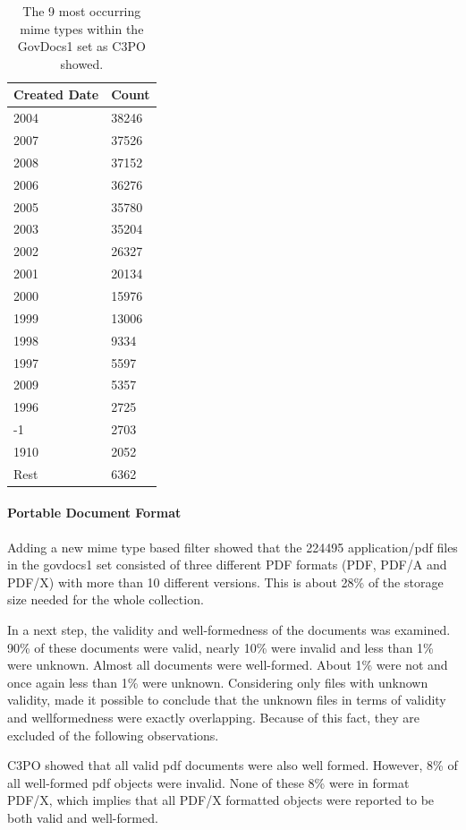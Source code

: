 \begin{table}[h]
\centering
\begin{tabular}{l || l }
\hline
Created Date & Count \\
\hline
\hline
2004 	& 38246 \\
2007 	&  37526 \\
2008		&  37152 \\
2006 	&  36276 \\
2005		&  35780 \\
2003		&  35204 \\
2002		&  26327 \\
2001		&  20134 \\
2000		& 15976 \\
1999		& 13006 \\
1998		&  9334 \\
1997		&  5597 \\
2009		&  5357\\
1996		&  2725\\
-1		&  2703\\
1910		&  2052\\
Rest		&  6362\\
 \hline
\end{tabular}
\caption{The 9 most occurring mime types within the GovDocs1 set as C3PO showed.}
\label{tab:govdocs1_created}
\end{table}

\paragraph{Portable Document Format}
Adding a new mime type based filter showed that the 224495 application/pdf files in the govdocs1 set consisted of three different PDF formats (PDF, PDF/A and PDF/X) with more than 10 different versions.
This is about 28\% of the storage size  needed for the whole collection.

In a next step, the validity and well-formedness of the documents was examined.
90\% of these documents were valid, nearly 10\% were invalid and less than 1\% were unknown.
Almost all documents were well-formed. About 1\% were not and once again less than 1\% were unknown.
Considering only files with unknown validity, made it possible to conclude that  the unknown files in terms of validity and wellformedness were exactly overlapping.
Because of this fact, they are excluded of the following observations.

C3PO showed that all valid pdf documents were also well formed.
However, 8\% of all well-formed pdf objects were invalid.
None of these 8\% were in format PDF/X, which implies that all PDF/X formatted objects were reported to be both valid and well-formed.

